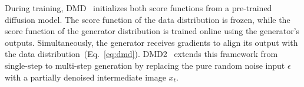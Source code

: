 During training, DMD~\cite{yin2024onestep} initializes both score functions from a pre-trained diffusion model. 
The score function of the data distribution is frozen, while the score function of the generator distribution is trained online using the generator's outputs.
Simultaneously, the generator receives gradients to align its output with the data distribution~(Eq.~\ref{eq:dmd}).  
DMD2~\cite{yin2024improved} extends this framework from single-step to multi-step generation by replacing the pure random noise input $\epsilon$ with a partially denoised intermediate image $x_t$.


